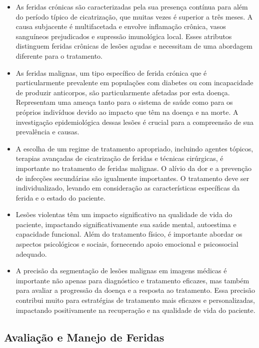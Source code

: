 \begin{itemize}
         
    \item As feridas crónicas são caracterizadas pela sua presença contínua para além do período típico de cicatrização, que muitas vezes é superior a três meses. A causa subjacente é multifacetada e envolve inflamação crônica, vasos sanguíneos prejudicados e supressão imunológica local. Esses atributos distinguem feridas crônicas de lesões agudas e necessitam de uma abordagem diferente para o tratamento.

    \item As feridas malignas, um tipo específico de ferida crónica que é particularmente prevalente em populações com diabetes ou com incapacidade de produzir anticorpos, são particularmente afetadas por esta doença. Representam uma ameaça tanto para o sistema de saúde como para os próprios indivíduos devido ao impacto que têm na doença e na morte. A investigação epidemiológica dessas lesões é crucial para a compreensão de sua prevalência e causas.

    \item A escolha de um regime de tratamento apropriado, incluindo agentes tópicos, terapias avançadas de cicatrização de feridas e técnicas cirúrgicas, é importante no tratamento de feridas malignas. O alívio da dor e a prevenção de infecções secundárias são igualmente importantes. O tratamento deve ser individualizado, levando em consideração as características específicas da ferida e o estado do paciente.

    \item Lesões violentas têm um impacto significativo na qualidade de vida do paciente, impactando significativamente sua saúde mental, autoestima e capacidade funcional. Além do tratamento físico, é importante abordar os aspectos psicológicos e sociais, fornecendo apoio emocional e psicossocial adequado.

    \item A precisão da segmentação de lesões malignas em imagens médicas é importante não apenas para diagnóstico e tratamento eficazes, mas também para avaliar a progressão da doença e a resposta ao tratamento. Essa precisão contribui muito para estratégias de tratamento mais eficazes e personalizadas, impactando positivamente na recuperação e na qualidade de vida do paciente.
    
\end{itemize}

\subsection{Avaliação e Manejo de Feridas}

